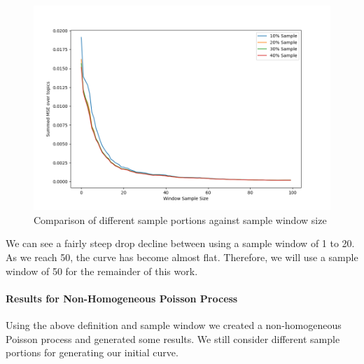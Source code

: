 \begin{figure}[H]
\center
\includegraphics[width=15cm]{figures/sse_avg.png}
\caption{Comparison of different sample portions against sample window size}
\end{figure}

We can see a fairly steep drop decline between using a sample window of 1 to 20. As we reach 50, the curve has become almost flat. Therefore, we will use a sample window of 50 for the remainder of this work.


\paragraph{Results for Non-Homogeneous Poisson Process} \label{nn_pp_def}

Using the above definition and sample window we created a non-homogeneous Poisson process and generated some results. We still consider different sample portions for generating our initial curve.

